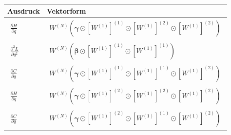\documentclass[a4paper, 12pt]{scrartcl}
\begin{document}
\begin{center}
    \begin{tabular}{l l}
        Ausdruck 
        &
        Vektorform
        \\[0.5em] \hline
        \noalign{\vspace{0.5em}}
        $\begin{aligned}
            \frac{\partial H}{\partial q}
        \end{aligned}$
        &
        $\begin{aligned}
            W^{(N)} \left(\bm{\gamma} \odot \left[W^{(1)}\right]^{(1)} \odot \left[W^{(1)}\right]^{(2)} \odot \left[W^{(1)}\right]^{(2)}\right)
        \end{aligned}$
        \\[0.5em] \hline
        \noalign{\vspace{0.5em}}
        $\begin{aligned}
            \frac{\partial^2 L}{\partial q^2}
        \end{aligned}$
        &
        $\begin{aligned}
            W^{(N)} \left(\bm{\beta} \odot \left[W^{(1)}\right]^{(1)} \odot \left[W^{(1)}\right]^{(1)}\right)
        \end{aligned}$
        \\[0.5em] \hline
        \noalign{\vspace{0.5em}}
        $\begin{aligned}
            \frac{\partial C}{\partial q}
        \end{aligned}$
        &
        $\begin{aligned}
            W^{(N)} \left(\bm{\gamma} \odot \left[W^{(1)}\right]^{(1)} \odot \left[W^{(1)}\right]^{(1)} \odot \left[W^{(1)}\right]^{(2)}\right)
        \end{aligned}$
        \\[0.5em] \hline
        \noalign{\vspace{0.5em}}
        $\begin{aligned}
            \frac{\partial H}{\partial \dot{q}}
        \end{aligned}$
        &
        $\begin{aligned}
            W^{(N)} \left(\bm{\gamma} \odot \left[W^{(1)}\right]^{(2)} \odot \left[W^{(1)}\right]^{(2)} \odot \left[W^{(1)}\right]^{(2)}\right)
        \end{aligned}$
        \\[0.5em] \hline
        \noalign{\vspace{0.5em}}
        $\begin{aligned}
            \frac{\partial C}{\partial \dot{q}}
        \end{aligned}$
        &
        $\begin{aligned}
            W^{(N)} \left(\bm{\gamma} \odot \left[W^{(1)}\right]^{(2)} \odot \left[W^{(1)}\right]^{(1)} \odot \left[W^{(1)}\right]^{(2)}\right)
        \end{aligned}$
    \end{tabular}
\end{center}
\end{document}
